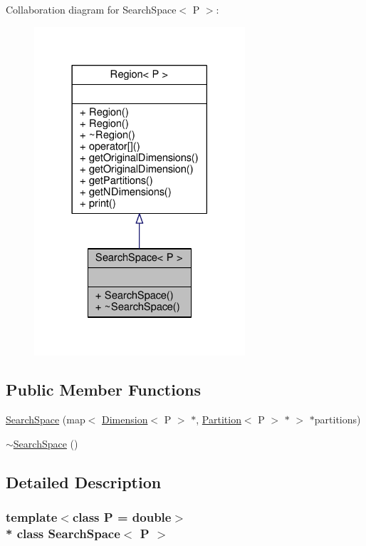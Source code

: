 Collaboration diagram for Search\+Space$<$ P $>$\+:\nopagebreak
\begin{figure}[H]
\begin{center}
\leavevmode
\includegraphics[width=222pt]{classSearchSpace__coll__graph}
\end{center}
\end{figure}
\subsection*{Public Member Functions}
\begin{DoxyCompactItemize}
\item 
\hyperlink{classSearchSpace_a6730e3f4bc5237f1ac1ba779f3d93bff}{Search\+Space} (map$<$ \hyperlink{classDimension}{Dimension}$<$ P $>$ $\ast$, \hyperlink{classPartition}{Partition}$<$ P $>$ $\ast$ $>$ $\ast$partitions)
\item 
\hyperlink{classSearchSpace_a2951e3838e24ad16a0222b87f8564ab0}{$\sim$\+Search\+Space} ()
\end{DoxyCompactItemize}


\subsection{Detailed Description}
\subsubsection*{template$<$class P = double$>$\\*
class Search\+Space$<$ P $>$}

